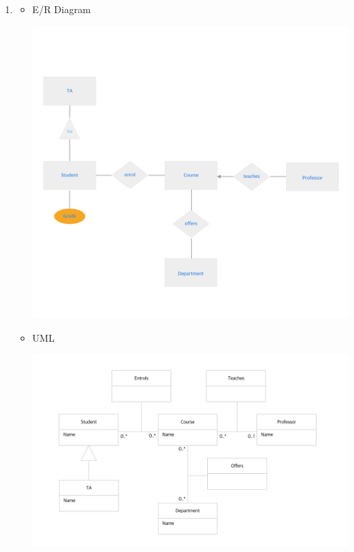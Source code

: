 \documentclass[12pt]{article}
\begin{document}
\begin{enumerate}[1.]
\begin{itemize}
    \end{itemize}

    \item

    \begin{itemize}
        \item E/R Diagram

        \begin{center}
        \includegraphics[width=\linewidth]{images/worksheet_15_solution_19.png}
        \end{center}

        \item UML

        \begin{center}
        \includegraphics[width=\linewidth]{images/worksheet_15_solution_20.png}
        \end{center}


\end{itemize}
\end{enumerate}
\end{document}
